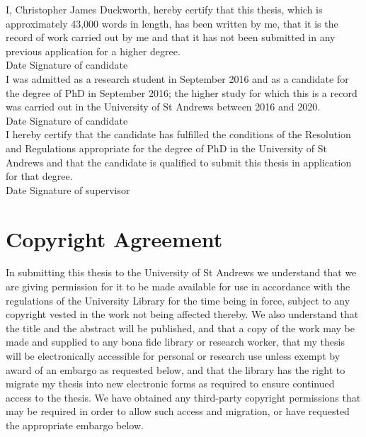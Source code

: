 \documentclass[11pt]{book}
\begin{document}
I, Christopher James Duckworth, hereby certify that this thesis, which is approximately 43,000 words in length, has been written by me, that it is the record of work carried out by me and that it has not been submitted in any previous application for a higher degree.\\

Date  \hspace{1.8in} Signature of candidate \\

I was admitted as a research student in September 2016 and as a candidate for the degree of PhD in September 2016; the higher study for which this is a record was carried out in the University of St Andrews between 2016 and 2020.\\

Date  \hspace{1.8in} Signature of candidate \\

I hereby certify that the candidate has fulfilled the conditions of the Resolution and Regulations appropriate for the degree of PhD in the University of St Andrews and that the candidate is qualified to submit this thesis in application for that degree.\\

Date  \hspace{1.8in} Signature of supervisor \\

\chapter{Copyright Agreement}

In submitting this thesis to the University of St Andrews we understand that we are giving permission for it to be made available for use in accordance with the regulations of the University Library for the time being in force, subject to any copyright vested in the work not being affected thereby. We also understand that the title and the abstract will be published, and that a copy of the work may be made and supplied to any bona fide library or research worker, that my thesis will be electronically accessible for personal or research use unless exempt by award of an embargo as requested below, and that the library has the right to migrate my thesis into new electronic forms as required to ensure continued access to the thesis. We have obtained any third-party copyright permissions that may be required in order to allow such access and migration, or have requested the appropriate embargo below.\\
\end{document}
